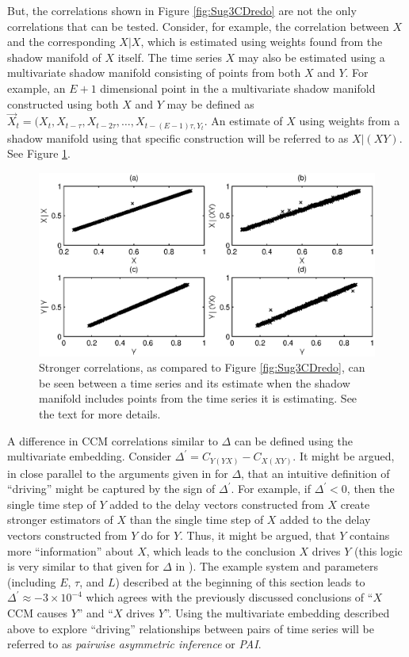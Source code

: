 \documentclass[a4paper,11pt,twocolumn]{article}
\begin{document}
But, the correlations shown in Figure \ref{fig:Sug3CDredo} are not the only correlations that can be tested.  Consider, for example, the correlation between $X$ and the corresponding $X|X$, which is estimated using weights found from the shadow manifold of $X$ itself.  The time series $X$ may also be estimated using a multivariate shadow manifold consisting of points from both $X$ and $Y$.  For example, an $E+1$ dimensional point in the a multivariate shadow manifold constructed using both $X$ and $Y$ may be defined as $\vec{X}_t=(X_t,X_{t-\tau},X_{t-2\tau},\ldots,X_{t-(E-1)\tau,Y_t}$.  An estimate of $X$ using weights from a shadow manifold using that specific construction will be referred to as $X|(XY)$.  See Figure \ref{fig:PAIintro}.
\begin{figure}[ht]
\includegraphics[scale=0.55]{SugFig3CD_AddPlot.eps}
\caption{Stronger correlations, as compared to Figure \ref{fig:Sug3CDredo}, can be seen between a time series and its estimate when the shadow manifold includes points from the time series it is estimating.  See the text for more details.}
\label{fig:PAIintro}
\end{figure}

A difference in CCM correlations similar to $\Delta$ can be defined using the multivariate embedding.  Consider $\Delta^\prime = C_{Y(YX)} - C_{X(XY)}$.  It might be argued, in close parallel to the arguments given in \cite{Sugihara2012} for $\Delta$, that an intuitive definition of ``driving'' might be captured by the sign of $\Delta^\prime$.  For example, if $\Delta^\prime<0$, then the single time step of $Y$ added to the delay vectors constructed from $X$ create stronger estimators of $X$ than the single time step of $X$ added to the delay vectors constructed from $Y$ do for $Y$.  Thus, it might be argued, that $Y$ contains more ``information'' about $X$, which leads to the conclusion $X$ drives $Y$ (this logic is very similar to that given for $\Delta$ in \cite{Sugihara2012}).  The example system and parameters (including $E$, $\tau$, and $L$) described at the beginning of this section leads to $\Delta^\prime \approx -3\times 10^{-4}$ which agrees with the previously discussed conclusions of ``$X$ CCM causes $Y$'' and ``$X$ drives $Y$''.  Using the multivariate embedding described above to explore ``driving'' relationships between pairs of time series will be referred to as {\em pairwise asymmetric inference} or {\em PAI}.  
\end{document}
